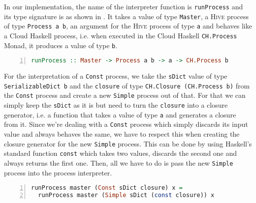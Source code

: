 In our implementation, the name of the interpreter function is \texttt{runProcess} and its type signature is as shown in . It takes a value of type \texttt{Master}, a \textsc{Hive} process of type \texttt{Process a b}, an argument for the \textsc{Hive} process of type \texttt{a} and behaves like a \textsf{Cloud Haskell} process, i.e. when executed in the \textsf{Cloud Haskell} \texttt{CH.Process} Monad, it produces a value of type \texttt{b}.
\begin{lstlisting}[language=Haskell,caption=Signature of the process interpreter.,label=lst:interpreter_signature,numbers=left,frame=bt]
runProcess :: Master -> Process a b -> a -> CH.Process b
\end{lstlisting}

For the interpretation of a \texttt{Const} process, we take the \texttt{sDict} value of type \texttt{SerializableDict b} and the \texttt{closure} of type \texttt{CH.Closure (CH.Process b)} from the \texttt{Const} process and create a new \texttt{Simple} process out of that. For that we can simply keep the \texttt{sDict} as it is but need to turn the \texttt{closure} into a closure generator, i.e. a function that takes a value of type \texttt{a} and generates a closure from it. Since we're dealing with a \texttt{Const} process which simply discards its input value and always behaves the same, we have to respect this when creating the closure generator for the new \texttt{Simple} process. This can be done by using Haskell's standard function \texttt{const} which takes two values, discards the second one and always returns the first one. Then, all we have to do is pass the new \texttt{Simple} process into the process interpreter.
\begin{lstlisting}[language=Haskell,caption=Implementation of the interpreter of \texttt{Const} processes.,label=lst:runprocess_const,numbers=left,frame=bt]
runProcess master (Const sDict closure) x =
  runProcess master (Simple sDict (const closure)) x
\end{lstlisting}

